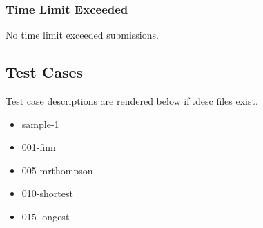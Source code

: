 \documentclass{article}%
\begin{document}
%
\subsubsection{Time Limit Exceeded}%
\label{ssubsec:TimeLimitExceeded}%
No time limit exceeded submissions.%

%
\subsection{Test Cases}%
\label{subsec:TestCases}%
Test case descriptions are rendered below if .desc files exist.%
\begin{itemize}%
\item%
sample{-}1%
\item%
001{-}finn%
%
\item%
005{-}mrthompson%
%
\item%
010{-}shortest%
\item%
015{-}longest%
\end{itemize}

%
\end{document}
